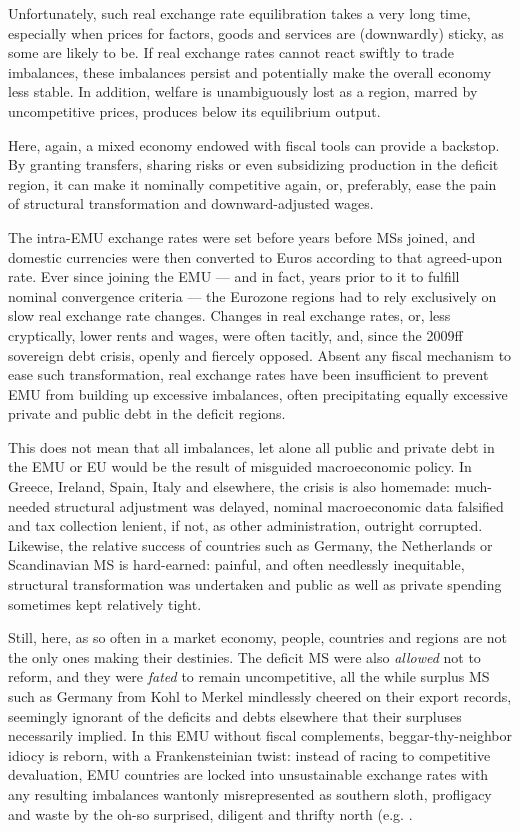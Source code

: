 \documentclass[11pt,a4paper,oneside,openright]{article}
\begin{document}
Unfortunately, such real exchange rate equilibration takes a very long time, especially when prices for factors, goods and services are (downwardly) sticky, as some are likely to be. 
If real exchange rates cannot react swiftly to trade imbalances, these imbalances persist and potentially make the overall economy less stable. 
In addition, welfare is unambiguously lost as a region, marred by uncompetitive prices, produces below its equilibrium output.

Here, again, a mixed economy endowed with fiscal tools can provide a backstop. 
By granting transfers, sharing risks or even subsidizing production in the deficit region, it can make it nominally competitive again, or, preferably, ease the pain of structural transformation and downward-adjusted wages. 

The intra-\gls{EMU} exchange rates were set before years before \glspl{MS} joined, and domestic currencies were then converted to Euros according to that agreed-upon rate. 
Ever since joining the \gls{EMU} --- and in fact, years prior to it to fulfill nominal convergence criteria --- the Eurozone regions had to rely exclusively on slow real exchange rate changes. 
Changes in real exchange rates, or, less cryptically, lower rents and wages, were often tacitly, and, since the 2009ff sovereign debt crisis, openly and fiercely opposed. 
Absent any fiscal mechanism to ease such transformation, real exchange rates have been insufficient to prevent \gls{EMU} from building up excessive imbalances, often precipitating equally excessive private and public debt in the deficit regions. 

This does not mean that all imbalances, let alone all public and private debt in the \gls{EMU} or \gls{EU} would be the result of misguided macroeconomic policy. 
In Greece, Ireland, Spain, Italy and elsewhere, the crisis is also homemade: 
much-needed structural adjustment was delayed, nominal macroeconomic data falsified and tax collection lenient, if not, as other administration, outright corrupted. 
Likewise, the relative success of countries such as Germany, the Netherlands or Scandinavian \gls{MS} is hard-earned: 
painful, and often needlessly inequitable, structural transformation was undertaken and public as well as private spending sometimes kept relatively tight.

Still, here, as so often in a market economy, people, countries and regions are not the only ones making their destinies. 
The deficit \gls{MS} were also \emph{allowed} not to reform, and they were \emph{fated} to remain uncompetitive, all the while surplus \gls{MS} such as Germany from Kohl to Merkel mindlessly cheered on their export records, seemingly ignorant of the deficits and debts elsewhere that their surpluses necessarily implied. 
In this \gls{EMU} without fiscal complements, beggar-thy-neighbor idiocy is reborn, with a Frankensteinian twist: 
instead of racing to competitive devaluation, \gls{EMU} countries are locked into unsustainable exchange rates with any resulting imbalances wantonly misrepresented as southern sloth, profligacy and waste by the oh-so surprised, diligent and thrifty north (e.g. \citep[200]{Featherstone2011}.
\end{document}
